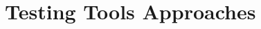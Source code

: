 \documentclass[10pt, conference, compsocconf]{IEEEtran}
\begin{document}
%

\section{Testing Tools Approaches}
\end{document}
